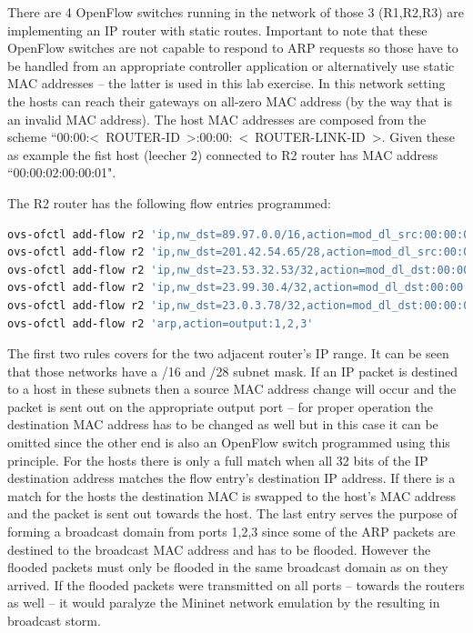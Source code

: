 \documentclass[a4paper]{article}
\begin{document}
There are 4 OpenFlow switches running in the network of those 3 (R1,R2,R3) are implementing an IP router with static
routes. Important to note that these OpenFlow switches are not capable to respond to ARP requests so those have to be
handled from an appropriate controller application or alternatively use static MAC addresses -- the latter is used in
this lab exercise. In this network setting the hosts can reach their gateways on all-zero MAC address (by the way that
is an invalid MAC address). The host MAC addresses are composed from the scheme
``00:00:\textless~ROUTER-ID~\textgreater:00:00:~\textless~ROUTER-LINK-ID~\textgreater. Given these as example the fist host (leecher 2) connected to R2 router has
MAC address ``00:00:02:00:00:01".

The R2 router has the following flow entries programmed:

\begin{lstlisting}[language=bash,frame=single,breaklines,caption={R2 router flow entry configuration},label=lst:R2-flow-config]
ovs-ofctl add-flow r2 'ip,nw_dst=89.97.0.0/16,action=mod_dl_src:00:00:00:00:00:00,output:4'
ovs-ofctl add-flow r2 'ip,nw_dst=201.42.54.65/28,action=mod_dl_src:00:00:00:00:00:00,output:5'
ovs-ofctl add-flow r2 'ip,nw_dst=23.53.32.53/32,action=mod_dl_dst:00:00:02:00:00:01,output:1'
ovs-ofctl add-flow r2 'ip,nw_dst=23.99.30.4/32,action=mod_dl_dst:00:00:02:00:00:02,output:2'
ovs-ofctl add-flow r2 'ip,nw_dst=23.0.3.78/32,action=mod_dl_dst:00:00:02:00:00:03,output:3'
ovs-ofctl add-flow r2 'arp,action=output:1,2,3' 
\end{lstlisting}

The first two rules covers for the two adjacent router's IP range. It can be seen that those networks have a /16 and
/28 subnet mask. If an IP packet is destined to a host in these subnets then a source MAC address change will occur and
the packet is sent out on the appropriate output port -- for proper operation the destination MAC address has to be
changed as well but in this case it can be omitted since the other end is also an OpenFlow switch programmed using this
principle.
For the hosts there is only a full match when all 32 bits of the IP destination address matches the flow entry's
destination IP address. If there is a match for the hosts the destination MAC is swapped to the host's MAC address and
the packet is sent out towards the host. The last entry serves the purpose of forming a broadcast domain from ports
1,2,3 since some of the ARP packets are destined to the broadcast MAC address and has to be flooded. However the
flooded packets must only be flooded in the same broadcast domain as on they arrived. If the flooded packets were
transmitted on all ports  -- towards the routers as well -- it would paralyze the Mininet network emulation by the
resulting in broadcast storm.
\end{document}
